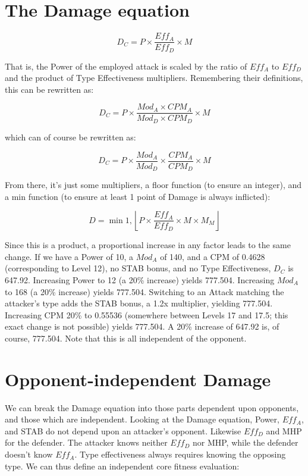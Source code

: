 \section{The Damage equation}

\[ D_C = P \times \frac{Eff_A}{Eff_D} \times M \]

That is, the Power of the employed attack is scaled by the ratio of
 $Eff_A$ to $Eff_D$ and the product of Type Effectiveness multipliers.
Remembering their definitions, this can be rewritten as:

\[ D_C = P \times \frac{Mod_A \times CPM_A}{Mod_D \times CPM_D} \times M \]

which can of course be rewritten as:

\[ D_C = P \times \frac{Mod_A}{Mod_D} \times \frac{CPM_A}{CPM_D} \times M \]

From there, it's just some multipliers, a floor function (to ensure
 an integer), and a min function (to ensure at least 1 point of Damage
 is always inflicted):

\[ D = \min{1, \left\lfloor P \times \frac{Eff_A}{Eff_D} \times M \times M_M \right\rfloor } \]

Since this is a product, a proportional increase in any factor leads to
 the same change.
If we have a Power of 10, a $Mod_A$ of 140, and a CPM of 0.4628 (corresponding
 to Level 12), no STAB bonus, and no Type Effectiveness, $D_C$ is 647.92.
Increasing Power to 12 (a 20\% increase) yields 777.504.
Increasing $Mod_A$ to 168 (a 20\% increase) yields 777.504.
Switching to an Attack matching the attacker's type adds the
 STAB bonus, a 1.2x multiplier, yielding 777.504.
Increasing CPM 20\% to 0.55536 (somewhere between Levels 17 and 17.5; this
 exact change is not possible) yields 777.504.
A 20\% increase of 647.92 is, of course, 777.504.
Note that this is all independent of the opponent.

\section{Opponent-independent Damage}
We can break the Damage equation into those parts dependent
 upon opponents, and those which are independent.
Looking at the Damage equation, Power, $Eff_A$, and STAB do not depend
 upon an attacker's opponent.
Likewise $Eff_D$ and MHP for the defender.
The attacker knows neither $Eff_D$ nor MHP, while the defender doesn't know $Eff_A$.
Type effectiveness always requires knowing the opposing type.
We can thus define an independent core fitness evaluation:

